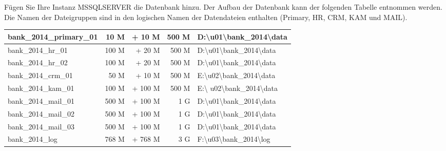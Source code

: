 \item Fügen Sie Ihre Instanz MSSQLSERVER die Datenbank  hinzu. Der Aufbau der Datenbank kann der folgenden Tabelle
entnommen werden. Die Namen der Dateigruppen sind in den logischen Namen der
Datendateien enthalten (Primary, HR, CRM, KAM und MAIL).
\begin{center}
  \begin{small}
    \tablehead{
    }
    \tabletail {
    }
    \tablelasttail {
    }
    \begin{supertabular}{lrrrl}
      bank\_2014\_primary\_01 &  10 M &  + 10 M & 500 M &
      D:\textbackslash u01\textbackslash bank\_2014\textbackslash data \\
      \hline
      bank\_2014\_hr\_01     & 100 M &  + 20 M & 500 M &
      D:\textbackslash u01\textbackslash bank\_2014\textbackslash data \\
      bank\_2014\_hr\_02     & 100 M &  + 20 M & 500 M &
      D:\textbackslash u01\textbackslash bank\_2014\textbackslash data \\
      \hline
      bank\_2014\_crm\_01    &  50 M &  + 10 M & 500 M &
      E:\textbackslash u02\textbackslash bank\_2014\textbackslash data \\
      \hline
      bank\_2014\_kam\_01    & 100 M & + 100 M & 500 M & E:\textbackslash
      u02\textbackslash bank\_2014\textbackslash data \\
      \hline
      bank\_2014\_mail\_01    & 500 M & + 100 M & 1 G &
      D:\textbackslash u01\textbackslash bank\_2014\textbackslash data \\
      bank\_2014\_mail\_02    & 500 M & + 100 M & 1 G &
      D:\textbackslash u01\textbackslash bank\_2014\textbackslash data \\
      bank\_2014\_mail\_03    & 500 M & + 100 M & 1 G &
      D:\textbackslash u01\textbackslash bank\_2014\textbackslash data \\
      \hline
      bank\_2014\_log         & 768 M & + 768 M & 3 G &
      F:\textbackslash u03\textbackslash bank\_2014\textbackslash log  \\
    \end{supertabular}
  \end{small}
\end{center}
